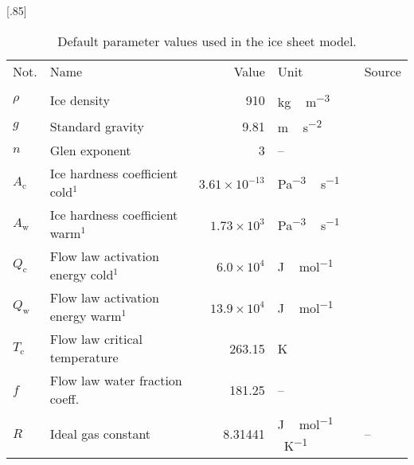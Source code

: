\documentclass[tc, manuscript]{copernicus}
\begin{document}
\begin{table*}
\caption{%
      Default parameter values used in the ice sheet model.}
\label{tab:params}
\scalebox{.85}[.85]
{\begin{tabular}{llrll}
    \tophline
    Not.    & Name & Value & Unit & Source \\
    \middlehline
    \multicolumn{2}{l}{{Ice rheology}} \\
    \cline{1-5}

    $\rho$  & Ice density
            & 910
            & \unit{kg\,m^{-3}}
            & \citet{Aschwanden.etal.2012} \\

    $g$     & Standard gravity
            & 9.81
            & \unit{m\,s^{-2}}
            & \citet{Aschwanden.etal.2012} \\

    $n$     & Glen exponent
            & 3
            & --
            & \citet{Cuffey.Paterson.2010} \\

    $A_{\mathrm{c}}$   & Ice hardness coefficient cold$^1$
            & $3.61\times10^{-13}$
            & \unit{Pa^{-3}\,s^{-1}}
            & \citet{Paterson.Budd.1982} \\

    $A_{\mathrm{w}}$   & Ice hardness coefficient warm$^1$
            & $1.73\times10^3$
            & \unit{Pa^{-3}\,s^{-1}}
            & \citet{Paterson.Budd.1982} \\

    $Q_{\mathrm{c}}$   & Flow law activation energy cold$^1$
            & $6.0\times10^4$
            & \unit{J\,mol^{-1}}
            & \citet{Paterson.Budd.1982} \\

    $Q_{\mathrm{w}}$   & Flow law activation energy warm$^1$
            & $13.9\times10^4$
            & \unit{J\,mol^{-1}}
            & \citet{Paterson.Budd.1982} \\

    $T_{\mathrm{c}}$   & Flow law critical temperature
            & 263.15
            & \unit{K}
            & \citet{Paterson.Budd.1982} \\

    $f$     & Flow law water fraction coeff.
            & 181.25
            & --
            & \citet{Lliboutry.Duval.1985} \\

    $R$     & Ideal gas constant
            & 8.31441
            & \unit{J\,mol^{-1}\,K^{-1}}
            & -- \\


\end{tabular}}
\end{table*}
\end{document}
